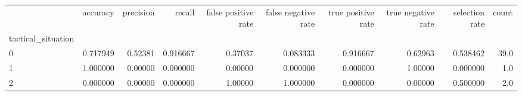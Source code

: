 \begin{tabular}{lrrrrrrrrr}
\toprule
{} &  accuracy &  precision &    recall &  false positive rate &  false negative rate &  true positive rate &  true negative rate &  selection rate &  count \\
tactical\_situation &           &            &           &                      &                      &                     &                     &                 &        \\
\midrule
0                  &  0.717949 &    0.52381 &  0.916667 &              0.37037 &             0.083333 &            0.916667 &             0.62963 &        0.538462 &   39.0 \\
1                  &  1.000000 &    0.00000 &  0.000000 &              0.00000 &             0.000000 &            0.000000 &             1.00000 &        0.000000 &    1.0 \\
2                  &  0.000000 &    0.00000 &  0.000000 &              1.00000 &             1.000000 &            0.000000 &             0.00000 &        0.500000 &    2.0 \\
\bottomrule
\end{tabular}
